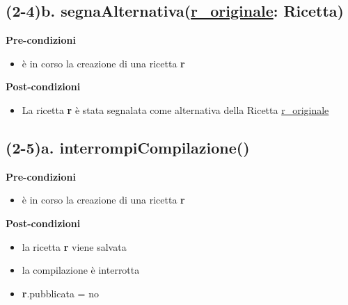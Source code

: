 \documentclass[12pt]{extarticle}
\begin{document}
\subsection*{(2-4)b. segnaAlternativa(\underline{r\_originale}: Ricetta)}

\textbf{Pre-condizioni}
\begin{itemize}
  \item è in corso la creazione di una ricetta \textbf{r}
\end{itemize}
\textbf{Post-condizioni}
\begin{itemize}
  \item La ricetta \textbf{r} è stata segnalata come alternativa della Ricetta \underline{r\_originale}
\end{itemize}

\subsection*{(2-5)a. interrompiCompilazione()}

\textbf{Pre-condizioni}
\begin{itemize}
  \item è in corso la creazione di una ricetta  \textbf{r}
\end{itemize}
\textbf{Post-condizioni}
\begin{itemize}
  \item la ricetta  \textbf{r} viene salvata
  \item la compilazione è interrotta
  \item \textbf{r}.pubblicata = no
\end{itemize}
\end{document}
